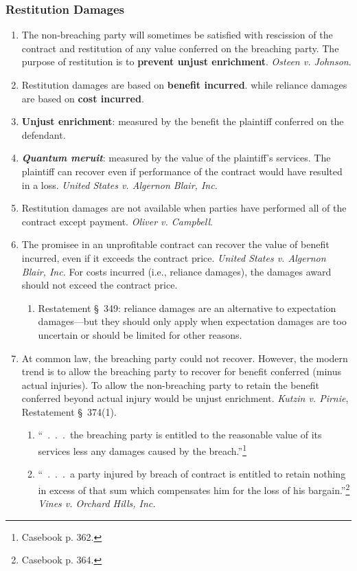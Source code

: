 \subsubsection{Restitution Damages}

\begin{enumerate}
    \item The non-breaching party will sometimes be satisfied with rescission 
    of the contract and restitution of any value conferred on the breaching 
    party. The purpose of restitution is to \textbf{prevent unjust 
    enrichment}. \emph{Osteen v. Johnson}.
    \item Restitution damages are based on \textbf{benefit incurred}. while 
    reliance damages are based on \textbf{cost incurred}.
    \item \textbf{Unjust enrichment}: measured by the benefit the plaintiff 
    conferred on the defendant.
    \item \textbf{\emph{Quantum meruit}}: measured by the value of the 
    plaintiff's services. The plaintiff can recover even if performance of the 
    contract would have resulted in a loss. \emph{United States v. Algernon 
    Blair, Inc.}
    \item Restitution damages are not available when parties have performed 
    all of the contract except payment. \emph{Oliver v. Campbell}.
    \item The promisee in an unprofitable contract can recover the value of 
    benefit incurred, even if it exceeds the contract price. \emph{United 
    States v. Algernon Blair, Inc.} For costs incurred (i.e., reliance 
    damages), the damages award should not exceed the contract price.
    \begin{enumerate}
        \item Restatement \S\ 349: reliance damages are an alternative 
        to expectation damages---but they should only apply when expectation 
        damages are too uncertain or should be limited for other reasons.
    \end{enumerate}
    \item At common law, the breaching party could not recover. However, the 
    modern trend is to allow the breaching party to recover for benefit 
    conferred (minus actual injuries). To allow the non-breaching party to 
    retain the benefit conferred beyond actual injury would be unjust 
    enrichment. \emph{Kutzin v. Pirnie}, Restatement \S\ 374(1).
    \begin{enumerate}
        \item ``~.~.~.~the breaching party is entitled to the reasonable value 
        of its services less any damages caused by the 
        breach.''\footnote{Casebook p. 362.}
        \item ``~.~.~.~a party injured by breach of contract is entitled to 
        retain nothing in excess of that sum which compensates him for the 
        loss of his bargain.''\footnote{Casebook p. 364.} \emph{Vines v. 
        Orchard Hills, Inc.}
    \end{enumerate}
\end{enumerate}

